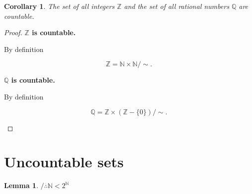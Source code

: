 \documentclass[10pt,a4paper]{book}
\newtheorem{lemma}{Lemma}[section]
\newtheorem{corollary}{Corollary}[section]
\begin{document}
\begin{corollary} The set of all integers $\mathbb Z$ and the set of all rational numbers $\mathbb Q$
    are countable.
\end{corollary}

\begin{proof}

    \textbf{$\mathbb Z$ is countable.}

    By definition

    \[
        \mathbb Z
        =
        \mathbb N\times\mathbb N/\sim.
    \]

    \begin{fitchproof}[arrayenv=tabular]


    \end{fitchproof}

    \medskip

    \textbf{$\mathbb Q$ is countable.}

    By definition

    \[
        \mathbb Q
        =
        \mathbb Z\times(\mathbb Z-\{0\})/\sim.
    \]

    \begin{fitchproof}[arrayenv=tabular]


    \end{fitchproof}

\end{proof}

\section{Uncountable sets}

\begin{lemma} $/ \therefore \mathbb{N} <  2^\mathbb{N} $ \\

\end{lemma}
\end{document}
